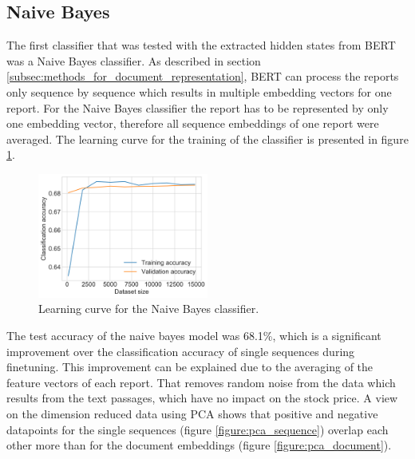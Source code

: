 \subsection{Naive Bayes}
\label{subsec:nb_results}
The first classifier that was tested with the extracted hidden states from \ac{BERT} was a Naive Bayes classifier.
As described in section \ref{subsec:methods_for_document_representation}, \ac{BERT} can process the reports only sequence by sequence which results in multiple embedding vectors for one report.
For the Naive Bayes classifier the report has to be represented by only one embedding vector, therefore all sequence embeddings of one report were averaged.
The learning curve for the training of the classifier is presented in figure \ref{figure:nb_learning}.
\begin{figure}[h]
    \centering
    \includegraphics[width=0.5\textwidth]{figures/charts/nb_learning.png}
    \caption{Learning curve for the Naive Bayes classifier.}
    \label{figure:nb_learning}
\end{figure}
The test accuracy of the naive bayes model was 68.1\%, which is a significant improvement over the classification accuracy of single sequences during finetuning.
This improvement can be explained due to the averaging of the feature vectors of each report.
That removes random noise from the data which results from the text passages, which have no impact on the stock price.
A view on the dimension reduced data using \acl{PCA} shows that positive and negative datapoints for the single sequences (figure \ref{figure:pca_sequence}) overlap each other more than for the document embeddings (figure \ref{figure:pca_document}).
